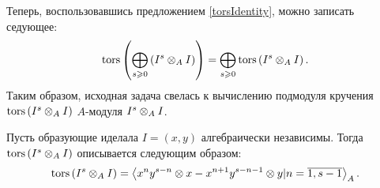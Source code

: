     Теперь, воспользовавшись предложением \ref{torsIdentity}, можно записать седующее:
    \begin{equation*}
        \textup{tors}\left(\bigoplus_{s \geqslant 0} \left( I^s \otimes_A I \right)\right) = 
        \bigoplus_{s \geqslant 0}\textup{tors}\left( I^s \otimes_A I \right).
    \end{equation*}
    Таким образом, исходная задача свелась к вычислению подмодуля кручения \\$\textup{tors}\left( I^s \otimes_A I \right)$ 
    $A$-модуля $I^s \otimes_A I$.
    \begin{Theorem} \label{tors_simple}
        Пусть образующие иделала $I = (x, y)$ алгебраически независимы. 
        Тогда $\textup{tors}\left(I^s \otimes_A I\right)$ описывается следующим образом:
        \begin{equation*}
            \textup{tors}\left(I^s \otimes_A I\right) = \left< x^ny^{s - n} \otimes x - x^{n + 1}y^{s - n - 1} \otimes y |
             n = \overline{1, s-1}\right>_A.
        \end{equation*}
    \end{Theorem}
